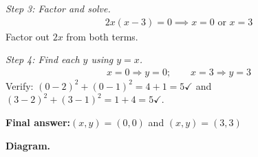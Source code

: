 \documentclass[11pt]{article}
\begin{document}
\textit{Step 3: Factor and solve.}
\[\begin{gathered}
2x(x - 3) = 0 \implies x = 0 \text{ or } x = 3
\end{gathered}\]
Factor out \( 2x \) from both terms.

\textit{Step 4: Find each \( y \) using \( y = x \).}
\[\begin{gathered}
x = 0 \Rightarrow y = 0; \qquad x = 3 \Rightarrow y = 3
\end{gathered}\]
Verify: \( (0-2)^2 + (0-1)^2 = 4 + 1 = 5 \checkmark \) and \( (3-2)^2 + (3-1)^2 = 1 + 4 = 5 \checkmark \).

\begin{answerbox}
\textbf{Final answer:}\quad \(\displaystyle (x, y) = (0, 0)\) and \(\displaystyle (x, y) = (3, 3)\)
\end{answerbox}
\textbf{Diagram.}
\end{document}
